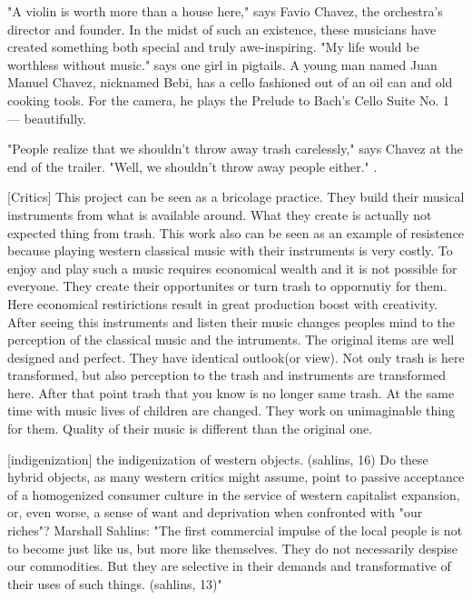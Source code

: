 "A violin is worth more than a house here," says Favio Chavez, the orchestra's director and founder. In the midst of such an existence, these musicians have created something both special and truly awe-inspiring. "My life would be worthless without music." says one girl in pigtails. A young man named Juan Manuel Chavez, nicknamed Bebi, has a cello fashioned out of an oil can and old cooking tools. For the camera, he plays the Prelude to Bach's Cello Suite No. 1 — beautifully.

"People realize that we shouldn't throw away trash carelessly," says Chavez at the end of the trailer. "Well, we shouldn't throw away people either." .

[Critics] This project can be seen as a bricolage practice. They build their musical instruments from what is available around. What they create is actually not expected thing from trash. This work also can be seen as an example of resistence because playing western classical music with their instruments is very costly. To enjoy and play such a music requires economical wealth and it is not possible for everyone. They create their opportunites or turn trash to oppornutiy for them. Here economical restirictions result in great production boost with creativity. After seeing this instruments and listen their music changes peoples mind to the perception of the classical music and the intruments. The original items are well designed and perfect. They have identical outlook(or view). Not only trash is here transformed, but also perception to the trash and instruments are transformed here. After that point trash that you know is no longer same trash. At the same time with music lives of children are changed. They work on unimaginable thing for them. Quality of their music is different than the original one. 

[indigenization] the indigenization of western objects. (sahlins, 16) Do these hybrid objects, as many western critics might assume, point to passive acceptance of a homogenized consumer culture in the service of western capitalist expansion, or, even worse, a sense of want and deprivation when confronted with "our riches"? Marshall Sahlins: "The first commercial impulse of the local people is not to become just like us, but more like themselves. They do not necessarily despise our commodities. But they are selective in their demands and transformative of their uses of such things. (sahlins, 13)" 



